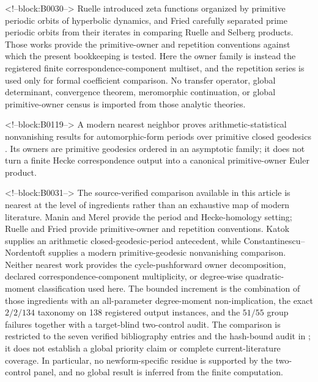\documentclass[11pt]{article}
\theoremstyle{definition}
\theoremstyle{remark}
\begin{document}
<!--block:B0030-->
Ruelle introduced zeta functions organized by primitive periodic orbits of hyperbolic dynamics, and Fried carefully separated prime periodic orbits from their iterates in comparing Ruelle and Selberg products.
\citep[Introduction and flow case]{ruelle1976}
\citep[Section~2]{fried1986}
Those works provide the primitive-owner and repetition conventions against which the present bookkeeping is tested. Here the owner family is instead the registered finite correspondence-component multiset, and the repetition series is used only for formal coefficient comparison. No transfer operator, global determinant, convergence theorem, meromorphic continuation, or global primitive-owner census is imported from those analytic theories.

<!--block:B0119-->
A modern nearest neighbor proves arithmetic-statistical nonvanishing results for automorphic-form periods over primitive closed geodesics \citep[Introduction and main theorems]{ConstantinescuNordentoft2025}. Its owners are primitive geodesics ordered in an asymptotic family; it does not turn a finite Hecke correspondence output into a canonical primitive-owner Euler product.

<!--block:B0031-->
The source-verified comparison available in this article is nearest at the level of ingredients rather than an exhaustive map of modern literature. Manin and Merel provide the period and Hecke-homology setting; Ruelle and Fried provide primitive-owner and repetition conventions. Katok supplies an arithmetic closed-geodesic-period antecedent, while Constantinescu--Nordentoft supplies a modern primitive-geodesic nonvanishing comparison. Neither nearest work provides the cycle-pushforward owner decomposition, declared correspondence-component multiplicity, or degree-wise quadratic-moment classification used here. The bounded increment is the combination of those ingredients with an all-parameter degree-moment non-implication, the exact $2/2/134$ taxonomy on 138 registered output instances, and the $51/55$ group failures together with a target-blind two-control audit. The comparison is restricted to the seven verified bibliography entries and the hash-bound audit in ; it does not establish a global priority claim or complete current-literature coverage. In particular, no newform-specific residue is supported by the two-control panel, and no global result is inferred from the finite computation.
\end{document}
